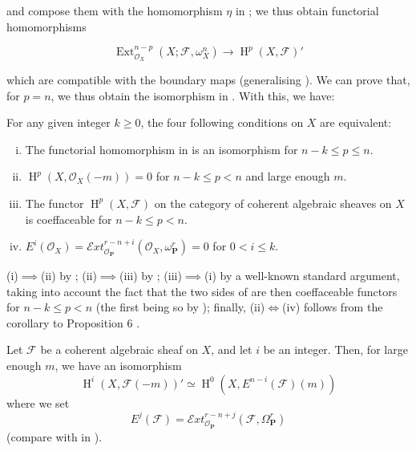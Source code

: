 and compose them with the homomorphism $\eta$ in ; we thus obtain functorial homomorphisms

\begin{equation}\tag{6.5}\label{fga1-equation-6.5}
  \operatorname{Ext}_{\mathcal{O}_X}^{n-p}(X;\mathcal{F},\omega_X^n) \to \operatorname{H}^p(X,\mathcal{F})'
\end{equation}

which are compatible with the boundary maps (generalising ).
We can prove that, for $p=n$, we thus obtain the isomorphism in .
With this, we have:


\begin{theorem}\label{fga1-theorem-3bis}
  For any given integer $k\geqslant0$, the four following conditions on $X$ are equivalent:
  \begin{enumerate}[i.]
    \item The functorial homomorphism in  is an isomorphism for $n-k\leqslant p\leqslant n$.
    \item $\operatorname{H}^p(X,\mathcal{O}_X(-m)) = 0$ for $n-k\leqslant p<n$ and large enough $m$.
    \item The functor $\operatorname{H}^p(X,\mathcal{F})$ on the category of coherent algebraic sheaves on $X$ is coeffaceable for $n-k\leqslant p<n$.
    \item $E^i(\mathcal{O}_X) = \mathcal{E}xt_{\mathcal{O}_\mathbf{P}}^{r-n+i}(\mathcal{O}_X,\omega_\mathbf{P}^r) = 0$ for $0<i\leqslant k$.
  \end{enumerate}
\end{theorem}


\begin{cproof}
  (i)$\implies$(ii) by ;
  (ii)$\implies$(iii) by ;
  (iii)$\implies$(i) by a well-known standard argument, taking into account the fact that the two sides of  are then coeffaceable functors for $n-k\leqslant p<n$ (the first being so by );
  finally, (ii)$\iff$(iv) follows from the corollary to Proposition 6 .
\end{cproof}

\begin{proposition}\label{fga1-proposition-6}
  Let $\mathcal{F}$ be a coherent algebraic sheaf on $X$, and let $i$ be an integer.
  Then, for large enough $m$, we have an isomorphism
  \begin{equation}\tag{6.6}\label{fga1-equation-6.6}
    \operatorname{H}^i(X,\mathcal{F}(-m))' \simeq \operatorname{H}^0(X,E^{n-i}(\mathcal{F})(m))
  \end{equation}
  where we set
  \begin{equation}\tag{6.7}\label{fga1-equation-6.7}
    E^j(\mathcal{F}) = \mathcal{E}xt_{\mathcal{O}_\mathbf{P}}^{r-n+j}(\mathcal{F},\Omega_\mathbf{P}^r)
  \end{equation}
  (compare with  in ).
\end{proposition}


